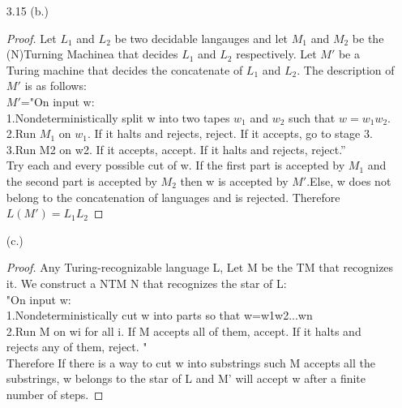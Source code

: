 \documentclass[10pt] {article}
\begin{document}
\begin{enumerate}
\begin{proof}
\begin{enumerate}
\item[2. ]Simulate the queue on the input tape of M. We write ‘\#’ on the left-hand end of the tape, to indicate the left-hand end. There two operations in DQA: push and pull. 
\item[i.]push\\
In order to push a new element on the left-hand end of the tape, move all characters, except ‘\#’, on the tape one cell to the right, then we make the head of the tape point to the blank right beside ‘\#’, and put the element in this position. 
\item[ii.]pull\\ 
Just cross out the elements that needed to be pulled out.
\end{enumerate}
In this way, we could simulate DQA by using Turing machine.
Because of (1) and (2), we say that a language can be recognized by a deterministic
queue automaton iff the language is Turing-recognizable. \end{proof}
\item[3.15]
(b.)\begin{proof}Let $L_1$ and $L_2$ be two decidable langauges and let $M_1$ and $M_2$ be the (N)Turning Machinea that decides $L_1$ and $L_2$ respectively. Let $M'$ be a Turing machine that decides the concatenate of $L_1$ and $L_2$. The description of $M'$ is as follows:\\
$M'$="On input w:\\
1.Nondeterministically split w into two tapes $w_1$ and $w_2$ such that $w=w_1w_2$.\\
2.Run $M_1$ on $w_1$. If it halts and rejects, reject. If it accepts, go to stage 3.\\
3.Run M2 on w2. If it accepts, accept. If it halts and rejects, reject.” \\
Try each and every possible cut of w. If the first part is accepted by $M_1$ and the second part is accepted by $M_2$ then w is accepted by $M'$.Else, w does not belong to the concatenation of languages and is rejected. Therefore $L(M')=L_1L_2$\end{proof}

(c.)\begin{proof}
Any Turing-recognizable language L, Let M be the TM that recognizes it. We
construct a NTM N that recognizes the star of L:\\
"On input w:\\
1.Nondeterministically cut w into parts so that w=w1w2...wn\\
2.Run M on wi for all i. If M accepts all of them, accept. If it halts and rejects any
of them, reject. "\\
Therefore If there is a way to cut w into substrings such M accepts all the substrings, w belongs to the star of L and M’ will accept w after a finite number of steps.\end{proof} 
\end{enumerate} 
\end{document}
